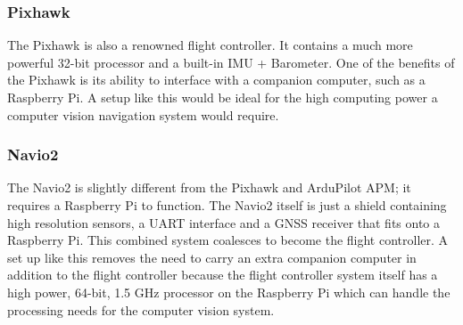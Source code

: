 		\subsubsection{Pixhawk}
			The Pixhawk is also a renowned flight controller. It contains a much more powerful 32-bit processor and a built-in IMU + Barometer. One of the benefits of the Pixhawk is its ability to interface with a companion computer, such as a Raspberry Pi. A setup like this would be ideal for the high computing power a computer vision navigation system would require.

		\subsubsection{Navio2}
			The Navio2 is slightly different from the Pixhawk and ArduPilot APM; it requires a Raspberry Pi to function. The Navio2 itself is just a shield containing high resolution sensors, a UART interface and a GNSS receiver that fits onto a Raspberry Pi. This combined system coalesces to become the flight controller. A set up like this removes the need to carry an extra companion computer in addition to the flight controller because the flight controller system itself has a high power, 64-bit, 1.5 GHz processor on the Raspberry Pi which can handle the processing needs for the computer vision system.


